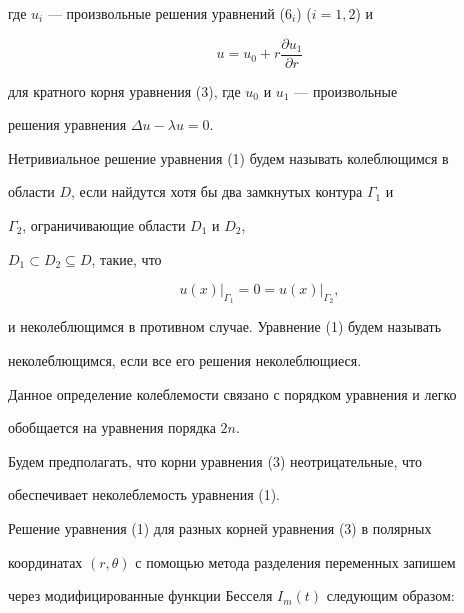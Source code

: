 где $u_i$ --- произвольные решения уравнений (6${}_i$) ($i=1,2$) и 


\begin{equation} 


u=u_0+r\frac{\partial u_1}{\partial r}\tag{5$''$} 


\end{equation} 


для кратного корня уравнения (3), где $u_0$ и $u_1$ --- произвольные 


решения уравнения $\Delta u-\lambda u=0$. 


 


\begin{defnnonum} 


Нетривиальное решение уравнения (1) будем называть колеблющимся в 


области $D$, если найдутся хотя бы два замкнутых контура $\Gamma_1$ и 


$\Gamma_2$, ограничивающие области $D_1$ и $D_2$, 


$D_1\subset D_2\subseteq D$, такие, что 


$$ 


u(x)\big|_{\Gamma_1}=0=u(x)\big|_{\Gamma_2},


$$ 


и неколеблющимся в противном случае. Уравнение (1) будем называть 


неколеблющимся, если все его решения неколеблющиеся.


\end{defnnonum} 


 


Данное определение колеблемости связано с порядком уравнения и легко 


обобщается на уравнения порядка $2n$. 


 


Будем предполагать, что корни уравнения (3) неотрицательные, что 


обеспечивает неколеблемость уравнения (1). 


 


Решение уравнения (1) для разных корней уравнения (3) в полярных 


координатах $(r,\theta)$ с помощью метода разделения переменных запишем 


через модифицированные функции Бесселя $I_m(t)$ следующим образом: 


